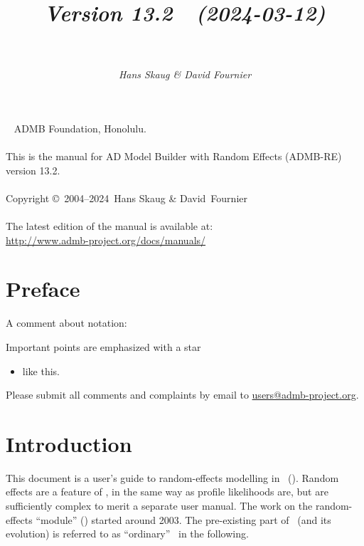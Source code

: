 \documentclass{admbmanual}
\newcommand\admbversion{13.2}
\newcommand\admbyear{2024}
\newcommand\admbdate{2024-03-12}
\begin{document}
\title{%
  \vspace{4.5ex}\textsf{\textit{Version \admbversion~~(\admbdate)\\[3pt]
      ~%
    }}\vspace{3ex}
}
\author{\textsf{\textit{Hans Skaug \& David Fournier}}}

\maketitle

~\vfill
\noindent ADMB Foundation, Honolulu.\\\\
\noindent This is the manual for AD Model Builder with Random Effects (ADMB-RE)
version \admbversion.\\\\
\noindent Copyright \copyright\ 2004--\admbyear\ Hans Skaug \& David~Fournier\\\\
\noindent The latest edition of the manual is available at:\\
\url{http://www.admb-project.org/docs/manuals/}

\tableofcontents

\chapter*{Preface}

A comment about notation:

Important points are emphasized with a star
\begin{itemize}
  \item[$\bigstar$] like this.
\end{itemize}

Please submit all comments and complaints by email to
\href{mailto:users@admb-project.org}{users@admb-project.org}.

\chapter{Introduction}

This document is a user's guide to random-effects modelling in \ADM\ (\scAB).
Random effects are a feature of \scAB, in the same way as profile likelihoods
are, but are sufficiently complex to merit a separate user manual. The work on
the random-effects ``module'' (\scAR) started around 2003. The pre-existing part
of \scAB\ (and its evolution) is referred to as ``ordinary'' \scAB\ in the
following.
\end{document}
